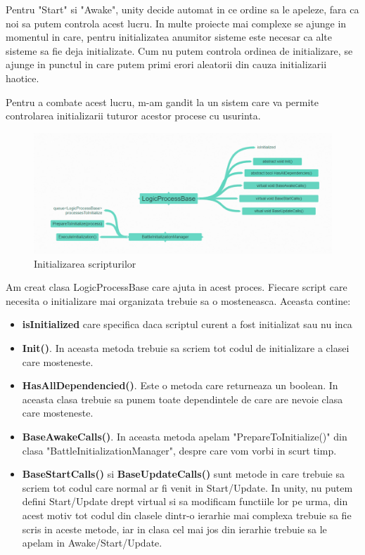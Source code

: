 \documentclass[12pt, a4paper]{article}
\begin{document}
	Pentru "Start" si "Awake", unity decide automat in ce ordine sa le apeleze, fara ca noi sa putem controla acest lucru. In multe proiecte mai complexe se ajunge in momentul in care, pentru initializatea anumitor sisteme este necesar ca alte sisteme sa fie deja initializate. Cum nu putem controla ordinea de initializare, se ajunge in punctul in care putem primi erori aleatorii din cauza initializarii haotice.
	
	Pentru a combate acest lucru, m-am gandit la un sistem care va permite controlarea initializarii tuturor acestor procese cu usurinta.
	
	\begin{figure}[H]
		\centering
		\includegraphics[width=1\textwidth]{logicProcessCoggle.png}
		\caption{Initializarea scripturilor}
		\label{fig: logicProcessCoggle}
	\end{figure}
	
	Am creat clasa LogicProcessBase care ajuta in acest proces. Fiecare script care necesita o initializare mai organizata trebuie sa o mosteneasca. Aceasta contine:
	\begin{itemize}
		\item \textbf{isInitialized} care specifica daca scriptul curent a fost initializat sau nu inca
		\item \textbf{Init()}. In aceasta metoda trebuie sa scriem tot codul de initializare a clasei care mosteneste.
		\item \textbf{HasAllDependencied()}. Este o metoda care returneaza un boolean. In aceasta clasa trebuie sa punem toate dependintele de care are nevoie clasa care mosteneste.
		\item \textbf{BaseAwakeCalls()}. In aceasta metoda apelam "PrepareToInitialize()" din clasa "BattleInitializationManager", despre care vom vorbi in scurt timp.
		\item \textbf{BaseStartCalls()} si \textbf{BaseUpdateCalls()} sunt metode in care trebuie sa scriem tot codul care normal ar fi venit in Start/Update. In unity, nu putem defini Start/Update drept virtual si sa modificam functiile lor pe urma, din acest motiv tot codul din clasele dintr-o ierarhie mai complexa trebuie sa fie scris in aceste metode, iar in clasa cel mai jos din ierarhie trebuie sa le apelam in Awake/Start/Update.
	\end{itemize}
\end{document}
